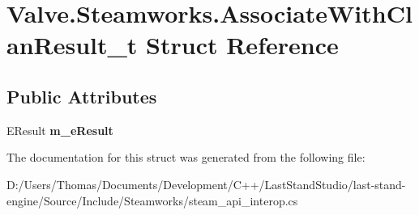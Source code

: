 \hypertarget{structValve_1_1Steamworks_1_1AssociateWithClanResult__t}{}\section{Valve.\+Steamworks.\+Associate\+With\+Clan\+Result\+\_\+t Struct Reference}
\label{structValve_1_1Steamworks_1_1AssociateWithClanResult__t}
\subsection*{Public Attributes}
\begin{DoxyCompactItemize}
\item 
\hypertarget{structValve_1_1Steamworks_1_1AssociateWithClanResult__t_a1e99a417a16798b3c75439f5f7d2ecc7}{}E\+Result {\bfseries m\+\_\+e\+Result}\label{structValve_1_1Steamworks_1_1AssociateWithClanResult__t_a1e99a417a16798b3c75439f5f7d2ecc7}

\end{DoxyCompactItemize}


The documentation for this struct was generated from the following file\+:\begin{DoxyCompactItemize}
\item 
D\+:/\+Users/\+Thomas/\+Documents/\+Development/\+C++/\+Last\+Stand\+Studio/last-\/stand-\/engine/\+Source/\+Include/\+Steamworks/steam\+\_\+api\+\_\+interop.\+cs\end{DoxyCompactItemize}
